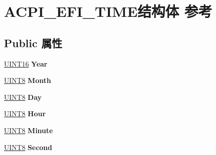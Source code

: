 \hypertarget{struct_a_c_p_i___e_f_i___t_i_m_e}{}\section{A\+C\+P\+I\+\_\+\+E\+F\+I\+\_\+\+T\+I\+M\+E结构体 参考}
\label{struct_a_c_p_i___e_f_i___t_i_m_e}
\subsection*{Public 属性}
\begin{DoxyCompactItemize}
\item 
\mbox{\label{struct_a_c_p_i___e_f_i___t_i_m_e_a3b2298324084d52a4f102785483705c5}} 
\hyperlink{_processor_bind_8h_a09f1a1fb2293e33483cc8d44aefb1eb1}{U\+I\+N\+T16} {\bfseries Year}
\item 
\mbox{\label{struct_a_c_p_i___e_f_i___t_i_m_e_a33f4ec4e6548339f8863c4c5d2f16518}} 
\hyperlink{_processor_bind_8h_ab27e9918b538ce9d8ca692479b375b6a}{U\+I\+N\+T8} {\bfseries Month}
\item 
\mbox{\label{struct_a_c_p_i___e_f_i___t_i_m_e_a120649bb38432623917b976e2a94e1ee}} 
\hyperlink{_processor_bind_8h_ab27e9918b538ce9d8ca692479b375b6a}{U\+I\+N\+T8} {\bfseries Day}
\item 
\mbox{\label{struct_a_c_p_i___e_f_i___t_i_m_e_a40c796a1460529c7e25e6cd219b36bf5}} 
\hyperlink{_processor_bind_8h_ab27e9918b538ce9d8ca692479b375b6a}{U\+I\+N\+T8} {\bfseries Hour}
\item 
\mbox{\label{struct_a_c_p_i___e_f_i___t_i_m_e_a29fd1a241f4c4a324975bc72c0df9d70}} 
\hyperlink{_processor_bind_8h_ab27e9918b538ce9d8ca692479b375b6a}{U\+I\+N\+T8} {\bfseries Minute}
\item 
\mbox{\label{struct_a_c_p_i___e_f_i___t_i_m_e_a2c88ddea57c057a00cbc391450930c25}} 
\hyperlink{_processor_bind_8h_ab27e9918b538ce9d8ca692479b375b6a}{U\+I\+N\+T8} {\bfseries Second}
\item 
\mbox{\label{struct_a_c_p_i___e_f_i___t_i_m_e_adbabb345e258b485880419eae7c7be0c}} 

\end{DoxyCompactItemize}
